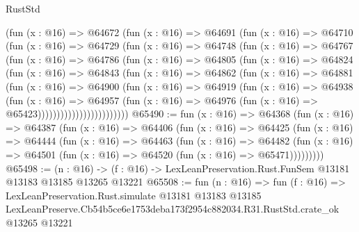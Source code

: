 \begin{lexlean}{RustStd}
\begin{coremodule}
                (fun (x : @16) =>
                @64672
                  (fun (x : @16) =>
                  @64691
                    (fun (x : @16) =>
                    @64710
                      (fun (x : @16) =>
                      @64729
                        (fun (x : @16) =>
                        @64748
                          (fun (x : @16) =>
                          @64767
                            (fun (x : @16) =>
                            @64786
                              (fun (x : @16) =>
                              @64805
                                (fun (x : @16) =>
                                @64824
                                  (fun (x : @16) =>
                                  @64843
                                    (fun (x : @16) =>
                                    @64862
                                      (fun (x : @16) =>
                                      @64881
                                        (fun (x : @16) =>
                                        @64900
                                          (fun (x : @16) =>
                                          @64919
                                            (fun (x : @16) =>
                                            @64938
                                              (fun (x : @16) =>
                                              @64957
                                                (fun (x : @16) =>
                                                @64976
                                                  (fun (x : @16) => @65423))))))))))))))))))))))))
@65490 := fun (x : @16) =>
  @64368
    (fun (x : @16) =>
    @64387
      (fun (x : @16) =>
      @64406
        (fun (x : @16) =>
        @64425
          (fun (x : @16) =>
          @64444
            (fun (x : @16) =>
            @64463
              (fun (x : @16) =>
              @64482
                (fun (x : @16) => @64501 (fun (x : @16) => @64520 (fun (x : @16) => @65471)))))))))
@65498 := (n : @16) ->
  (f : @16) -> LexLeanPreservation.Rust.FunSem @13181 @13183 @13185 @13265 @13221
@65508 := fun (n : @16) =>
  fun (f : @16) =>
  LexLeanPreservation.Rust.simulate
    @13181
    @13183
    @13185
    LexLeanPreserve.Cb54b5ce6e1753deba173f2954c882034.R31.RustStd.crate_ok
    @13265
    @13221
\end{coremodule}
\end{lexlean}
